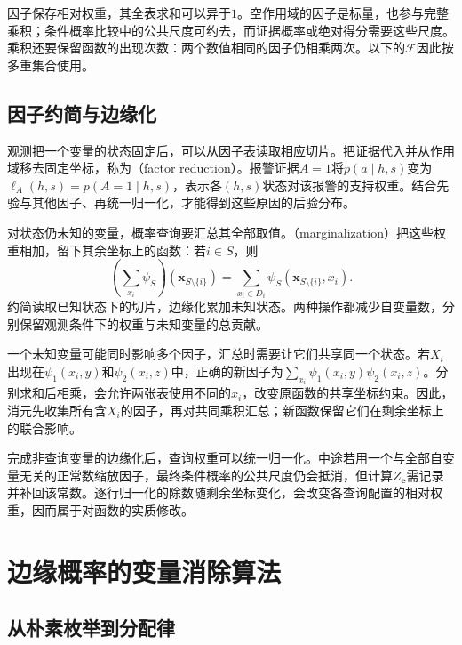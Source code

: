 因子保存相对权重，其全表求和可以异于$1$。空作用域的因子是标量，也参与完整乘积；条件概率比较中的公共尺度可约去，而证据概率或绝对得分需要这些尺度。乘积还要保留函数的出现次数：两个数值相同的因子仍相乘两次。以下的$\mathcal{F}$因此按多重集合使用。

\subsection{因子约简与边缘化}
\label{sec:pgm-elimination-reduction-marginalization}

观测把一个变量的状态固定后，可以从因子表读取相应切片。把证据代入并从作用域移去固定坐标，称为（factor reduction）。报警证据$A=1$将$p(a\mid h,s)$变为$\ell_A(h,s)=p(A=1\mid h,s)$，表示各$(h,s)$状态对该报警的支持权重。结合先验与其他因子、再统一归一化，才能得到这些原因的后验分布。

对状态仍未知的变量，概率查询要汇总其全部取值。（marginalization）把这些权重相加，留下其余坐标上的函数：若$i\in S$，则
\begin{equation}
  (\mathop{\textstyle\sum}_{x_i}\psi_S)
    (\bm{x}_{S\setminus\{i\}})
  =\sum_{x_i\in D_i}\psi_S(\bm{x}_{S\setminus\{i\}},x_i).
  \label{eq:pgm-elimination-factor-marginal}
\end{equation}
约简读取已知状态下的切片，边缘化累加未知状态。两种操作都减少自变量数，分别保留观测条件下的权重与未知变量的总贡献。

一个未知变量可能同时影响多个因子，汇总时需要让它们共享同一个状态。若$X_i$出现在$\psi_1(x_i,y)$和$\psi_2(x_i,z)$中，正确的新因子为$\sum_{x_i}\psi_1(x_i,y)\psi_2(x_i,z)$。分别求和后相乘，会允许两张表使用不同的$x_i$，改变原函数的共享坐标约束。因此，消元先收集所有含$X_i$的因子，再对共同乘积汇总；新函数保留它们在剩余坐标上的联合影响。

完成非查询变量的边缘化后，查询权重可以统一归一化。中途若用一个与全部自变量无关的正常数缩放因子，最终条件概率的公共尺度仍会抵消，但计算$Z_{\bm{e}}$需记录并补回该常数。逐行归一化的除数随剩余坐标变化，会改变各查询配置的相对权重，因而属于对函数的实质修改。

\section{边缘概率的变量消除算法}
\label{sec:pgm-elimination-sum-product}

\subsection{从朴素枚举到分配律}
\label{sec:pgm-elimination-distributivity}

